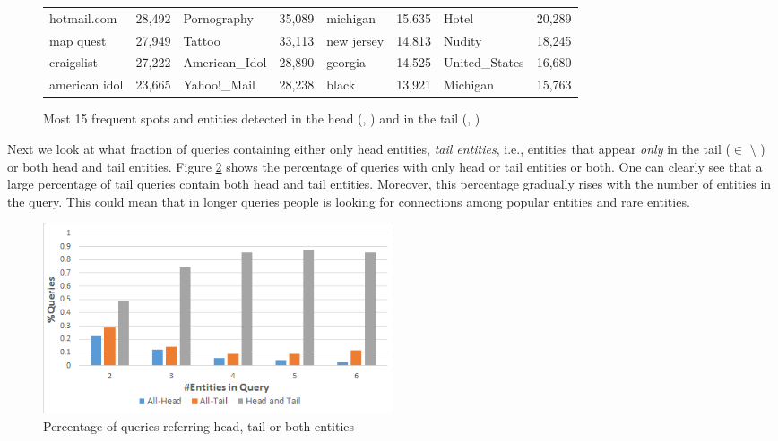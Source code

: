 \begin{figure}[t]
\begin{tabular}{lc|lc|lc|lc}
hotmail.com    & 28,492   &  Pornography       & 35,089   &  michigan    &   15,635  &   Hotel   		& 20,289 \\
map quest      & 27,949   &  Tattoo            & 33,113   &  new jersey  &   14,813  &   Nudity  		& 18,245 \\
craigslist     & 27,222   &  American\_Idol     & 28,890   &  georgia 	 &	14,525   &   United\_States   & 16,680 \\
american idol  & 23,665   &  Yahoo!\_Mail       & 28,238   &  black   	 &	13,921   &   Michigan        & 15,763 \\
\bottomrule
\end{tabular}
\label{tab:top-frequent}
\caption{Most 15 frequent spots and entities detected in the head (\shead{}, \ehead{}) and in the tail (\stail{}, \etail{})}
\end{figure}


Next we look at what fraction of queries containing either only head entities, \emph{tail entities}, i.e., entities 
that appear \emph{only} in the tail ($\in$ \etail{} $\setminus$ \ehead{})
or both head and tail entities. Figure \ref{img:headTailEntPercent} shows the percentage of 
queries with only head or tail entities or both. One can clearly see that a large percentage of tail 
queries contain both head and tail entities. Moreover, this percentage gradually rises with the 
number of entities in the query. This could mean that in longer queries people is looking 
for connections among popular entities and rare entities. 

\begin{figure}
\label{img:headTailEntPercent}
  \centering
    \includegraphics[width = 0.5\textwidth]{images/entity-head-tail-count.png}
	
	\caption{Percentage of queries referring head, tail or both entities}
	
\end{figure}
 
